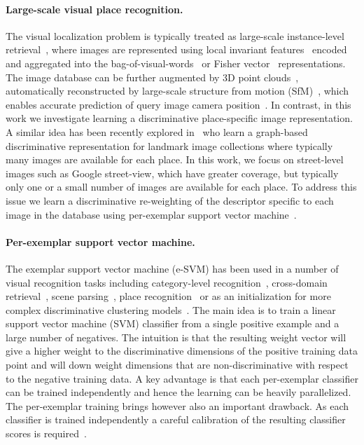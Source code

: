\paragraph{Large-scale visual place recognition.}
    The visual localization problem is typically treated as large-scale instance-level retrieval~\cite{Cummins09,Chen11,Gronat13,Knopp2010,Schindler07,Torii2013,Zamir10}, where images are represented using local invariant
    features~\cite{Lowe04} encoded and aggregated into the bag-of-visual-words~\cite{Csurka04,Sivic03} or Fisher vector~\cite{Jegou12} representations. 
    The image database can be further augmented by 3D point clouds~\cite{Klinger13}, automatically
    reconstructed by large-scale structure from motion
    (SfM)~\cite{Agarwal-ICCV-2009,Klinger13}, which enables accurate prediction of query image camera position~\cite{Li12,Sattler12}.
    In contrast, in this work we investigate learning a discriminative place-specific image representation. A similar idea has been recently explored in~\cite{Cao13} 
    who learn a graph-based discriminative representation for landmark image collections where typically many images are available for each place.
    In this work, we focus on street-level images such as Google street-view, which have greater coverage, but typically only one or a small number of images are  available for each place.  To address this issue we learn a discriminative re-weighting of the descriptor specific to each image in the database using per-exemplar support vector machine~\cite{Malisiewicz11}.
    
    
\paragraph{Per-exemplar support vector machine.} 
    The exemplar support vector machine (e-SVM) has been used in a number of visual recognition tasks including
    category-level recognition~\cite{Malisiewicz11}, cross-domain retrieval~\cite{Shrivastava11}, scene parsing~\cite{Tighe13}, %
    place recognition~\cite{Gronat13} or as an initialization  for more complex discriminative clustering models~\cite{Doersch12,Singh12}. The main idea is to train a linear support vector machine (SVM) classifier from a single positive example and a large number of negatives. The intuition is that the resulting weight vector will give a higher weight to the discriminative dimensions of the positive training data point and will down weight dimensions that are non-discriminative with respect to the negative training data. A key advantage is that each per-exemplar classifier can be trained independently and hence the learning can be heavily parallelized. 
    The per-exemplar training brings however also an important drawback. As each classifier is trained independently a
    careful calibration of the resulting classifier scores is required~\cite{Malisiewicz11}. 

